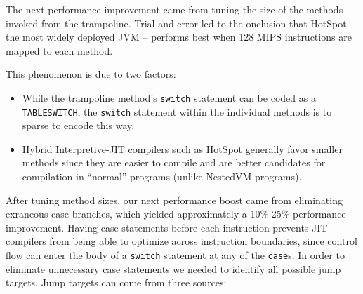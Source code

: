 \documentclass{acmconf}
\begin{document}
The next performance improvement came from tuning the size of the
methods invoked from the trampoline.  Trial and error led to the
onclusion that HotSpot \cite{hotspot} -- the most widely deployed JVM
-- performs best when 128 MIPS instructions are mapped to each method.


This phenomenon is due to two factors:

\begin{itemize}

\item While the trampoline method's {\tt switch} statement can be
      coded as a {\tt TABLESWITCH}, the {\tt switch} statement
      within the individual methods is to sparse to encode this way.

\item Hybrid Interpretive-JIT compilers such as HotSpot generally
      favor smaller methods since they are easier to compile and are
      better candidates for compilation in ``normal'' programs (unlike
      NestedVM programs).

\end{itemize}

After tuning method sizes, our next performance boost came from
eliminating exraneous case branches, which yielded approximately a
10\%-25\% performance improvement.  Having case statements before each
instruction prevents JIT compilers from being able to optimize across
instruction boundaries, since control flow can enter the body of a
{\tt switch} statement at any of the {\tt case}s.  In order to
eliminate unnecessary case statements we needed to identify all
possible jump targets.  Jump targets can come from three sources:
\end{document}
